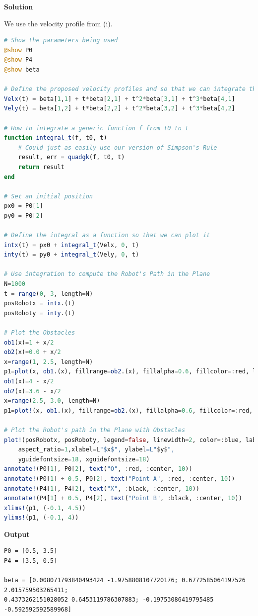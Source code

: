 \textbf{Solution}

We use the velocity profile from (i). 

\begin{lstlisting}[language=Julia,style=mystyle]
# Show the parameters being used
@show P0
@show P4
@show beta

# Define the proposed velocity profiles and so that we can integrate them
Velx(t) = beta[1,1] + t*beta[2,1] + t^2*beta[3,1] + t^3*beta[4,1] 
Vely(t) = beta[1,2] + t*beta[2,2] + t^2*beta[3,2] + t^3*beta[4,2] 

# How to integrate a generic function f from t0 to t
function integral_t(f, t0, t)
    # Could just as easily use our version of Simpson's Rule
    result, err = quadgk(f, t0, t)
    return result
end

# Set an initial position
px0 = P0[1]
py0 = P0[2]

# Define the integral as a function so that we can plot it
intx(t) = px0 + integral_t(Velx, 0, t)
inty(t) = py0 + integral_t(Vely, 0, t)

# Use integration to compute the Robot's Path in the Plane
N=1000
t = range(0, 3, length=N)
posRobotx = intx.(t)
posRoboty = inty.(t)

# Plot the Obstacles
ob1(x)=1 + x/2
ob2(x)=0.0 + x/2
x=range(1, 2.5, length=N)
p1=plot(x, ob1.(x), fillrange=ob2.(x), fillalpha=0.6, fillcolor=:red, label=false)
ob1(x)=4 - x/2
ob2(x)=3.6 - x/2
x=range(2.5, 3.0, length=N)
p1=plot!(x, ob1.(x), fillrange=ob2.(x), fillalpha=0.6, fillcolor=:red, label=false)

# Plot the Robot's path in the Plane with Obstacles
plot!(posRobotx, posRoboty, legend=false, linewidth=2, color=:blue, label=false, 
    aspect_ratio=1,xlabel=L"$x$", ylabel=L"$y$",
    yguidefontsize=18, xguidefontsize=18)
annotate!(P0[1], P0[2], text("O", :red, :center, 10))
annotate!(P0[1] + 0.5, P0[2], text("Point A", :red, :center, 10))
annotate!(P4[1], P4[2], text("X", :black, :center, 10))
annotate!(P4[1] + 0.5, P4[2], text("Point B", :black, :center, 10))
xlims!(p1, (-0.1, 4.5))
ylims!(p1, (-0.1, 4))

\end{lstlisting}
\textbf{Output} 
\begin{verbatim}
P0 = [0.5, 3.5]
P4 = [3.5, 0.5]

beta = [0.008071793840493424 -1.9758808107720176; 0.6772585064197526 2.015759503265411; 
0.4373262151028052 0.6453119786307883; -0.19753086419795485 -0.592592592589968]
\end{verbatim}


